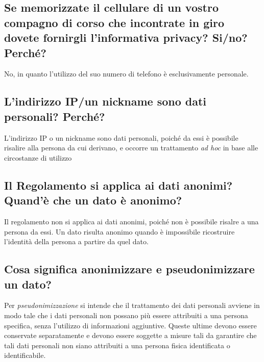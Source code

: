 \subsection{Se memorizzate il cellulare di un vostro compagno di corso che incontrate in giro dovete fornirgli
l’informativa privacy? Si/no? Perché?}
No, in quanto l'utilizzo del suo numero di telefono è esclusivamente personale.

\subsection{L'indirizzo IP/un nickname sono dati personali? Perché?}
L'indirizzo IP o un nickname sono dati personali, poiché da essi è possibile risalire alla persona da cui derivano, e occorre un trattamento \textit{ad hoc} in base alle circostanze di utilizzo

\subsection{Il Regolamento si applica ai dati anonimi? Quand’è che un dato è anonimo?}
Il regolamento non si applica ai dati anonimi, poiché non è possibile risalre a una persona da essi.
Un dato risulta anonimo quando è impossibile ricostruire l'identità della persona a partire da quel dato.

\subsection{Cosa significa anonimizzare e pseudonimizzare un dato?}
Per \textit{pseudonimizzazione} si intende che il trattamento dei dati personali avviene in modo tale che i dati personali non possano più essere attribuiti a una persona specifica, senza l'utilizzo di informazioni aggiuntive. Queste ultime devono essere conservate separatamente e devono essere soggette a misure tali da garantire che tali dati personali non siano attribuiti a una persona fisica identificata o identificabile.

